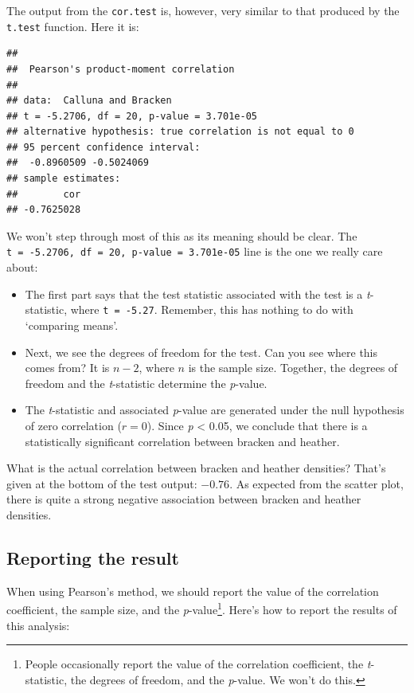 \documentclass[
]{book}
\providecommand{\tightlist}{%
  \setlength{\itemsep}{0pt}\setlength{\parskip}{0pt}}
\begin{document}
The output from the \texttt{cor.test} is, however, very similar to that produced by the \texttt{t.test} function. Here it is:

\begin{verbatim}
## 
##  Pearson's product-moment correlation
## 
## data:  Calluna and Bracken
## t = -5.2706, df = 20, p-value = 3.701e-05
## alternative hypothesis: true correlation is not equal to 0
## 95 percent confidence interval:
##  -0.8960509 -0.5024069
## sample estimates:
##        cor 
## -0.7625028
\end{verbatim}

We won't step through most of this as its meaning should be clear. The \texttt{t\ =\ -5.2706,\ df\ =\ 20,\ p-value\ =\ 3.701e-05} line is the one we really care about:

\begin{itemize}
\tightlist
\item
  The first part says that the test statistic associated with the test is a \emph{t}-statistic, where \texttt{t\ =\ -5.27}. Remember, this has nothing to do with `comparing means'.
\item
  Next, we see the degrees of freedom for the test. Can you see where this comes from? It is \(n-2\), where \(n\) is the sample size. Together, the degrees of freedom and the \emph{t}-statistic determine the \emph{p}-value.
\item
  The \emph{t}-statistic and associated \emph{p}-value are generated under the null hypothesis of zero correlation (\(r = 0\)). Since \emph{p} \textless{} 0.05, we conclude that there is a statistically significant correlation between bracken and heather.
\end{itemize}

What is the actual correlation between bracken and heather densities? That's given at the bottom of the test output: \(-0.76\). As expected from the scatter plot, there is quite a strong negative association between bracken and heather densities.

\hypertarget{reporting-the-result}{%
\subsection{Reporting the result}\label{reporting-the-result}}

When using Pearson's method, we should report the value of the correlation coefficient, the sample size, and the \emph{p}-value\footnote{People occasionally report the value of the correlation coefficient, the \emph{t}-statistic, the degrees of freedom, and the \emph{p}-value. We won't do this.}. Here's how to report the results of this analysis:
\end{document}
